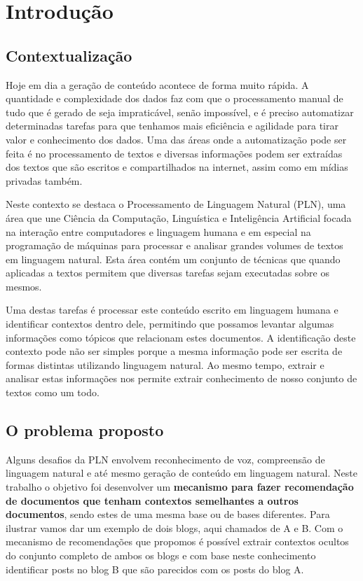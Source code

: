 \section{Introdução}

\subsection{Contextualização}

Hoje em dia a geração de conteúdo acontece de forma muito rápida. A quantidade e complexidade dos dados faz com que o processamento manual de tudo 
que é gerado de seja impraticável, senão impossível, e é preciso automatizar determinadas tarefas para que tenhamos mais eficiência e agilidade para 
tirar valor e conhecimento dos dados. Uma das áreas onde a automatização pode ser feita é no processamento de textos e diversas informações podem 
ser extraídas dos textos que são escritos e compartilhados na internet, assim como em mídias privadas também.

Neste contexto se destaca o Processamento de Linguagem Natural (PLN), uma área que une Ciência da Computação, Linguística e Inteligência Artificial 
focada na interação entre computadores e linguagem humana e em especial na programação de máquinas para processar e analisar grandes volumes de 
textos em linguagem natural. Esta área contém um conjunto de técnicas que quando aplicadas a textos permitem que diversas tarefas sejam executadas 
sobre os mesmos. 

Uma destas tarefas é processar este conteúdo escrito em linguagem humana e identificar contextos dentro dele, permitindo que possamos levantar 
algumas informações como tópicos que relacionam estes documentos. A identificação deste contexto pode não ser simples porque a mesma informação 
pode ser escrita de formas distintas utilizando linguagem natural. Ao mesmo tempo, extrair e analisar estas informações nos permite extrair 
conhecimento de nosso conjunto de textos como um todo.

\subsection{O problema proposto}

Alguns desafios da PLN envolvem reconhecimento de voz, compreensão de linguagem natural e até mesmo geração de conteúdo em linguagem natural. 
Neste trabalho o objetivo foi desenvolver um \textbf{mecanismo para fazer recomendação de documentos que tenham contextos semelhantes a outros documentos}, 
sendo estes de uma mesma base ou de bases diferentes. Para ilustrar vamos dar um exemplo de dois blogs, aqui chamados de A e B. Com o mecanismo de 
recomendações que propomos é possível extrair contextos ocultos do conjunto completo de ambos os blogs e com base neste conhecimento identificar posts 
no blog B que são parecidos com os posts do blog A.

